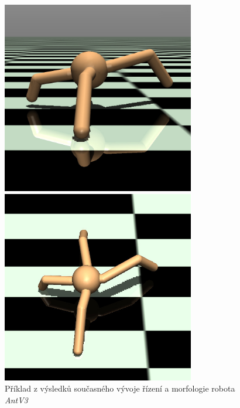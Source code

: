 \begin{figure}[h!]
    \centering
    \begin{minipage}{0.5\textwidth}
        \centering
        \includegraphics[width=0.75\textwidth]{../img/crop_exp2_para_side1.jpg}
    \end{minipage}%
    \begin{minipage}{0.5\textwidth}
        \centering
        \includegraphics[width=0.75\textwidth]{../img/crop_exp2_para_top1.jpg}
    \end{minipage}
    \caption{Příklad z výsledků současného vývoje řízení a morfologie robota
    \emph{AntV3}}
    \label{fig:exp2_para_body_show}
\end{figure}

